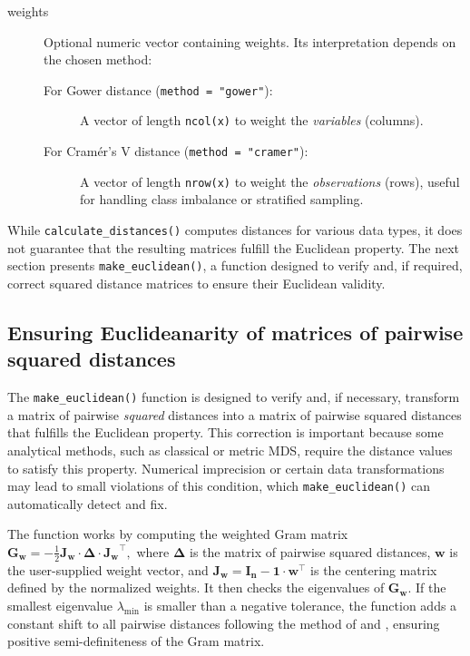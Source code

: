 \begin{description}
\item[weights] Optional numeric vector containing weights. Its interpretation depends on the
chosen method:
\begin{description}
      \item[For Gower distance (\texttt{method = "gower"}):] A vector of length \texttt{ncol(x)} to
weight the \textit{variables} (columns).
\item[For Cramér’s V distance (\texttt{method = "cramer"}):] A vector of length \texttt{nrow(x)}
to weight the \textit{observations} (rows), useful for handling class imbalance or
stratified sampling.
    \end{description}

\end{description}

While \texttt{calculate\_distances()} computes distances for various data types, it does not guarantee that the resulting matrices fulfill the Euclidean property. The next section presents \texttt{make\_euclidean()}, a function designed to verify and, if required, correct squared distance matrices to ensure their Euclidean validity.

\subsection{Ensuring Euclideanarity of matrices of pairwise squared distances}

The \texttt{make\_euclidean()} function is designed to verify and, if necessary, transform a matrix of pairwise \emph{squared} distances into a matrix of pairwise squared distances that fulfills the Euclidean property. This correction is important because some analytical methods, such as classical or metric MDS, require the distance values to satisfy this property. Numerical imprecision or certain data transformations may lead to small violations of this condition, which \texttt{make\_euclidean()} can automatically detect and fix.

The function works by computing the weighted Gram matrix
$\mathbf{G}_{\mathbf{w}} = -\frac{1}{2} \mathbf{J}_{\mathbf{w}} \cdot \mathbf{\Delta} \cdot \mathbf{J_\mathbf{w}}^{\top},$ where $\mathbf{\Delta}$ is the matrix of pairwise squared distances, $\mathbf{w}$ is the user-supplied weight vector, and $\mathbf{J_\mathbf{w}} = \mathbf{I_n} - \mathbf{1} \cdot \mathbf{w}^\top$
is the centering matrix defined by the normalized weights. It then checks the eigenvalues of $\mathbf{G}_{\mathbf{w}}$. If the smallest eigenvalue $\lambda_{\min}$ is smaller than a negative tolerance, the function adds a constant shift to all pairwise distances following the method of \cite{lingoes1971some} and \cite{mardia1978some}, ensuring positive semi-definiteness of the Gram matrix.

